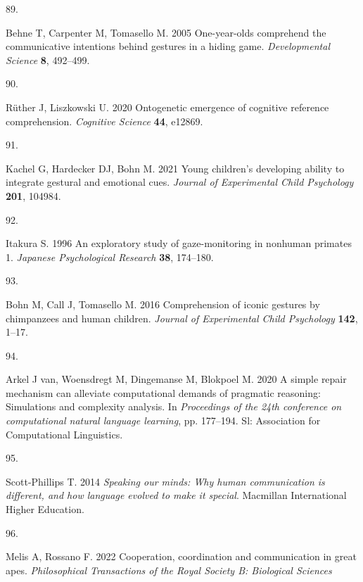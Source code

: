 \documentclass[
  man,floatsintext]{apa6}
\newlength{\cslhangindent}
\newlength{\csllabelwidth}
\newlength{\cslentryspacingunit} %
\newenvironment{CSLReferences}[2] %
 {%
  \setlength{\parindent}{0pt}
  \ifodd #1
  \let\oldpar\par
  \def\par{\hangindent=\cslhangindent\oldpar}
  \fi
  \setlength{\parskip}{#2\cslentryspacingunit}
 }%
 {}
\newcommand{\CSLLeftMargin}[1]{\parbox[t]{\csllabelwidth}{#1}}
\newcommand{\CSLRightInline}[1]{\parbox[t]{\linewidth - \csllabelwidth}{#1}\break}
\begin{document}
\begin{CSLReferences}{0}{0}
\leavevmode{}%
\CSLLeftMargin{89. }
\CSLRightInline{Behne T, Carpenter M, Tomasello M. 2005 One-year-olds comprehend the communicative intentions behind gestures in a hiding game. \emph{Developmental Science} \textbf{8}, 492--499.}

\leavevmode{}%
\CSLLeftMargin{90. }
\CSLRightInline{Rüther J, Liszkowski U. 2020 Ontogenetic emergence of cognitive reference comprehension. \emph{Cognitive Science} \textbf{44}, e12869.}

\leavevmode{}%
\CSLLeftMargin{91. }
\CSLRightInline{Kachel G, Hardecker DJ, Bohn M. 2021 Young children's developing ability to integrate gestural and emotional cues. \emph{Journal of Experimental Child Psychology} \textbf{201}, 104984.}

\leavevmode{}%
\CSLLeftMargin{92. }
\CSLRightInline{Itakura S. 1996 An exploratory study of gaze-monitoring in nonhuman primates 1. \emph{Japanese Psychological Research} \textbf{38}, 174--180.}

\leavevmode{}%
\CSLLeftMargin{93. }
\CSLRightInline{Bohn M, Call J, Tomasello M. 2016 Comprehension of iconic gestures by chimpanzees and human children. \emph{Journal of Experimental Child Psychology} \textbf{142}, 1--17.}

\leavevmode{}%
\CSLLeftMargin{94. }
\CSLRightInline{Arkel J van, Woensdregt M, Dingemanse M, Blokpoel M. 2020 A simple repair mechanism can alleviate computational demands of pragmatic reasoning: Simulations and complexity analysis. In \emph{Proceedings of the 24th conference on computational natural language learning}, pp. 177--194. Sl: Association for Computational Linguistics. }

\leavevmode{}%
\CSLLeftMargin{95. }
\CSLRightInline{Scott-Phillips T. 2014 \emph{Speaking our minds: Why human communication is different, and how language evolved to make it special}. Macmillan International Higher Education. }

\leavevmode{}%
\CSLLeftMargin{96. }
\CSLRightInline{Melis A, Rossano F. 2022 Cooperation, coordination and communication in great apes. \emph{Philosophical Transactions of the Royal Society B: Biological Sciences} }


\end{CSLReferences}
\end{document}
